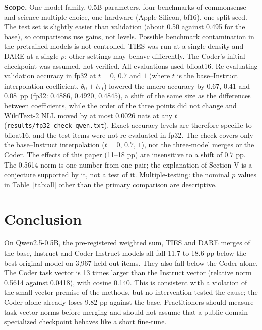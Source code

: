 \documentclass[conference]{IEEEtran}
\begin{document}
\textbf{Scope.} One model family, 0.5B parameters, four benchmarks of commonsense and science multiple choice, one hardware (Apple Silicon, bf16), one split seed. The test set is slightly easier than validation (about 0.50 against 0.495 for the base), so comparisons use gains, not levels. Possible benchmark contamination in the pretrained models is not controlled. TIES was run at a single density and DARE at a single $p$; other settings may behave differently. The Coder's initial checkpoint was assumed, not verified. All evaluations used bfloat16. Re-evaluating validation accuracy in fp32 at $t=0$, $0.7$ and $1$ (where $t$ is the base--Instruct interpolation coefficient, $\theta_0+t\tau_I$) lowered the macro accuracy by $0.67$, $0.41$ and $0.08$~pp (fp32: $0.4886$, $0.4920$, $0.4845$), a shift of the same size as the differences between coefficients, while the order of the three points did not change and WikiText-2 NLL moved by at most $0.0026$ nats at any $t$ (\texttt{results/fp32\_check\_qwen.txt}). Exact accuracy levels are therefore specific to bfloat16, and the test items were not re-evaluated in fp32. The check covers only the base--Instruct interpolation ($t=0$, $0.7$, $1$), not the three-model merges or the Coder. The effects of this paper (11--18 pp) are insensitive to a shift of $0.7$ pp. The 0.5614 norm is one number from one pair; the explanation of Section V is a conjecture supported by it, not a test of it. Multiple-testing: the nominal $p$ values in Table~\ref{tab:all} other than the primary comparison are descriptive.

\section{Conclusion}
On Qwen2.5-0.5B, the pre-registered weighted sum, TIES and DARE merges of the base, Instruct and Coder-Instruct models all fall 11.7 to 18.6 pp below the best original model on 3{,}967 held-out items. They also fall below the Coder alone. The Coder task vector is 13 times larger than the Instruct vector (relative norm 0.5614 against 0.0418), with cosine 0.140. This is consistent with a violation of the small-vector premise of the methods, but no intervention tested the cause; the Coder alone already loses 9.82 pp against the base. Practitioners should measure task-vector norms before merging and should not assume that a public domain-specialized checkpoint behaves like a short fine-tune.
\end{document}
